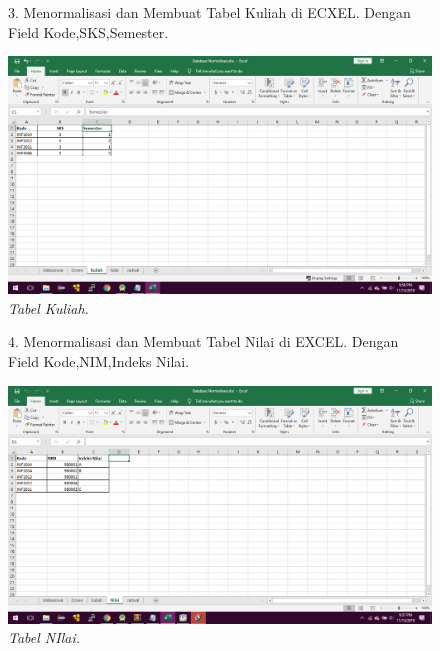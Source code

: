 \begin{enumerate}
\begin{figure}
\item[3.]Menormalisasi dan Membuat Tabel Kuliah di ECXEL. Dengan Field Kode,SKS,Semester.
    \begin{center}
    \includegraphics[scale=0.3]{figures/kuliah.png}
    \caption{\textit{Tabel Kuliah.}}
    \end{center}
    \label{gambar}
    \end{figure}

\begin{figure}
\item[4.]Menormalisasi dan Membuat Tabel Nilai di EXCEL. Dengan Field Kode,NIM,Indeks Nilai. 
    \begin{center}
    \includegraphics[scale=0.3]{figures/nilai.png}
    \caption{\textit{Tabel NIlai.}}
    \end{center}
    \label{gambar}
    \end{figure}


\end{enumerate}
